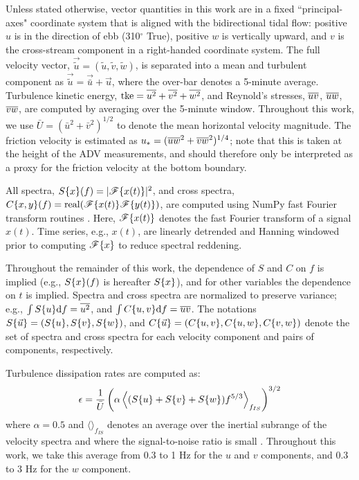 Unless stated otherwise, vector quantities in this work are in a fixed ``principal-axes" coordinate system that is aligned with the bidirectional tidal flow: positive $u$ is in the direction of ebb (310$^\circ$ True), positive $w$ is vertically upward, and $v$ is the cross-stream component in a right-handed coordinate system. The full velocity vector, $\vec{\tilde{u}} = (\tilde{u}, \tilde{v}, \tilde{w})$, is separated into a mean and turbulent component as $\vec{\tilde{u}} = \vec{\bar{u}} + \vec{u}$, where the over-bar denotes a 5-minute average. Turbulence kinetic energy, $\mathrm{tke} = \overline{u^2} + \overline{v^2}+\overline{w^2}$, and Reynold's stresses, $\overline{uv}$, $\overline{uw}$, $\overline{vw}$, are computed by averaging over the 5-minute window.  Throughout this work, we use $\bar{U} = (\bar{u}^2+\bar{v}^2)^{1/2}$ to denote the mean horizontal velocity magnitude. The friction velocity is estimated as $u_* = (\overline{uw}^2+\overline{vw}^2)^{1/4}$; note that this is taken at the height of the ADV measurements, and should therefore only be interpreted as a proxy for the friction velocity at the bottom boundary.

All spectra, $S\{x\}(f)=|\mathscr{F}\{x(t)\}|^2$, and cross spectra, $C\{x,y\}(f)=\mathrm{real}(\mathscr{F}\{x(t)\}\mathscr{F}\{y(t)\})$, are computed using NumPy fast Fourier transform routines \cite[]{Walt++2011}. Here, $\mathscr{F}\{x(t)\}$ denotes the fast Fourier transform of a signal $x(t)$. Time series, e.g., $x(t)$, are linearly detrended and Hanning windowed prior to computing $\mathscr{F}\{x\}$ to reduce spectral reddening.  

Throughout the remainder of this work, the dependence of $S$ and $C$ on $f$ is implied (e.g., $S\{x\}(f)$ is hereafter $S\{x\}$), and for other variables the dependence on $t$ is implied. Spectra and cross spectra are normalized to preserve variance; e.g., $\int S\{u\}\mathrm{d}f = \overline{u^2}$, and  $\int C\{u,v\}\mathrm{d}f = \overline{uv}$. The notations $S\{\vec{u}\}=(S\{u\}, S\{v\}, S\{w\})$, and $C\{\vec{u}\} = (C\{u,v\}, C\{u,w\}, C\{v,w\} )$ denote the set of spectra and cross spectra for each velocity component and pairs of components, respectively.

Turbulence dissipation rates are computed as:
\begin{align}
  \epsilon = \frac{1}{\bar{U}}\left(\alpha\left\langle(S\{u\}+S\{v\}+S\{w\})f^{5/3}\right\rangle_{f_{IS}}\right)^{3/2}
\end{align}
where  $\alpha=0.5$ and $\langle\rangle_{f_{IS}}$ denotes an average over the inertial subrange of the velocity spectra and where the signal-to-noise ratio is small \cite[]{Lumley+Terray1983,Sreenivasan1995}. Throughout this work, we take this average from 0.3 to 1 Hz for the $u$ and $v$ components, and 0.3 to 3 Hz for the $w$ component.

